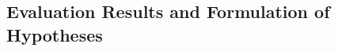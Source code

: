 \documentclass{llncs}
\begin{document}
{{\subsection{Evaluation Results and Formulation of Hypotheses}


%

}}
\end{document}

